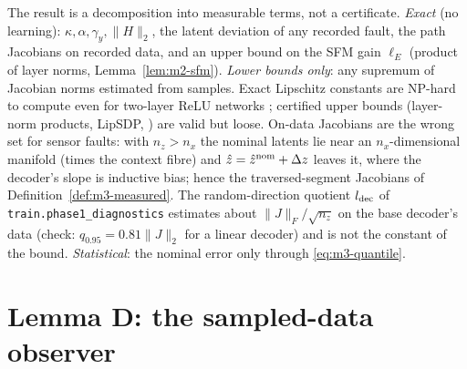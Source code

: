 \begin{remark}\label{rem:m3-cert}
The result is a decomposition into measurable terms, not a certificate. \emph{Exact} (no learning):
$\kappa,\alpha,\gamma_y,\|H\|_2$, the latent deviation of any recorded fault, the path Jacobians on
recorded data, and an upper bound on the SFM gain $\ell_E$ (product of layer norms,
Lemma~\ref{lem:m2-sfm}). \emph{Lower bounds only}: any supremum of Jacobian norms estimated from samples.
Exact Lipschitz constants are NP-hard to compute even for two-layer ReLU networks
\citep{virmaux2018lipschitz}; certified upper bounds (layer-norm products, LipSDP,
\citealp{fazlyab2019efficient}) are valid but loose. On-data Jacobians are the wrong set for sensor
faults: with $n_z>n_x$ the nominal latents lie near an $n_x$-dimensional manifold (times the context
fibre) and $\hat z=\hat z^{\rm nom}+\Delta z$ leaves it, where the decoder's slope is inductive bias; hence
the traversed-segment Jacobians of Definition~\ref{def:m3-measured}. The random-direction quotient
$l_{\rm dec}$ of \texttt{train.phase1\_diagnostics} estimates about $\|J\|_F/\sqrt{n_z}$ on the base
decoder's data (check: $q_{0.95}=0.81\|J\|_2$ for a linear decoder) and is not the constant of the
bound. \emph{Statistical}: the nominal error only through \eqref{eq:m3-quantile}.
\end{remark}

\appendix
\section{Lemma D: the sampled-data observer}

